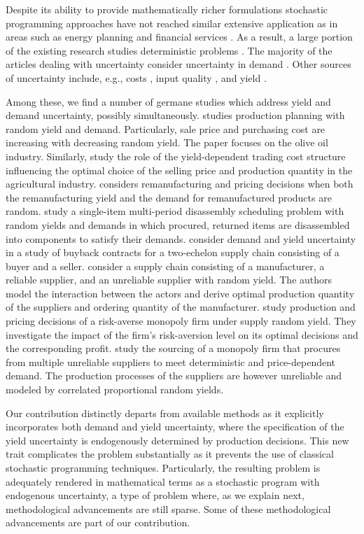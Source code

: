 \documentclass[12pt]{article}
\theoremstyle{thmstylethree}%
\begin{document}
Despite its ability to provide mathematically richer formulations \cite{MisU11} stochastic programming approaches have not reached similar extensive application as in areas such as energy planning and financial services \cite{KemKU11}. As a result, a large portion of the existing research studies deterministic problems \cite{JamYFXJ19}. The majority of the articles dealing with uncertainty consider uncertainty in demand \cite{DiaMP14}. Other sources of uncertainty include, e.g., costs \cite{LeuN07}, input quality \cite{DenFS10,GuaP11}, and yield \cite{YanL95}.

Among these, we find a number of germane studies which address yield and demand uncertainty, possibly simultaneously. \cite{Kaz04} studies production planning with random yield and demand. Particularly, sale price and purchasing cost are increasing with decreasing random yield. The paper focuses on the olive oil industry. 
Similarly, \cite{KazW11} study the role of the yield-dependent trading cost structure influencing the optimal choice of the selling price and production quantity in the agricultural industry. 
\cite{XiaYX15} considers remanufacturing and pricing decisions when both the remanufacturing yield and the demand for remanufactured products are random.
\cite{KanZ18} study a single-item multi-period disassembly scheduling problem with random yields and demands in which procured, returned items are disassembled into components to satisfy their demands. 
\cite{XieMG21} consider demand and yield uncertainty in a study of buyback contracts for a two-echelon supply chain consisting of a buyer and a seller. 
\cite{XiaGYL21} consider a supply chain consisting of a manufacturer, a reliable supplier, and an unreliable supplier with random yield. The authors model the interaction between the actors and derive optimal production quantity of the suppliers and ordering quantity of the manufacturer. 
\cite{KouXY21} study production and pricing decisions of a risk-averse monopoly firm  under supply random yield. They investigate the impact of the firm’s risk-aversion level on its optimal decisions and the corresponding profit. 
\cite{DonGXY22} study the sourcing of a monopoly firm that procures from multiple unreliable suppliers to meet deterministic and price-dependent demand. The production processes of the suppliers are however unreliable and modeled by correlated proportional random yields. 

Our contribution distinctly departs from available methods as it explicitly incorporates both demand and  yield uncertainty, where the specification of the yield uncertainty is endogenously determined by production decisions. This new trait complicates the problem substantially as it prevents the use of classical stochastic programming techniques. Particularly, the resulting problem is adequately rendered in mathematical terms as a stochastic program with endogenous uncertainty, a type of problem where, as we explain next, methodological advancements are still sparse. Some of these methodological advancements are part of our contribution.
\end{document}
